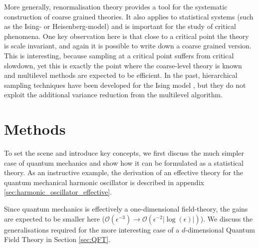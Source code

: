 \documentclass[11pt]{article}
\begin{document}
More generally, renormalisation theory provides a tool for the systematic construction of coarse grained theories. It also applies to statistical systems (such as the Ising- or Heisenberg-model) and is important for the study of critical phenomena. One key observation here is that close to a critical point the theory is scale invariant, and again it is possible to write down a coarse grained version. This is interesting, because sampling at a critical point suffers from critical slowdown, yet this is exactly the point where the coarse-level theory is known and multilevel methods are expected to be efficient. In the past, hierarchical sampling techniques have been developed for the Ising model \cite{Schmidt1983,Faas1986}, but they do not exploit the additional variance reduction from the multilevel algorithm.
\section{Methods}
To set the scene and introduce key concepts, we first discuss the much simpler case of quantum mechanics and show how it can be formulated as a statistical theory. As an instructive example, the derivation of an effective theory for the quantum mechanical harmonic oscillator is described in appendix \ref{sec:harmonic_oscillator_effective}.

Since quantum mechanics is effectively a one-dimensional field-theory, the gains are expected to be smaller here ($\mathcal{O}(\epsilon^{-3})\rightarrow\mathcal{O}(\epsilon^{-2}|\log(\epsilon)|)$). We discuss the generalisations required for the more interesting case of a $d$-dimensional Quantum Field Theory in Section \ref{sec:QFT}. 
\end{document}
